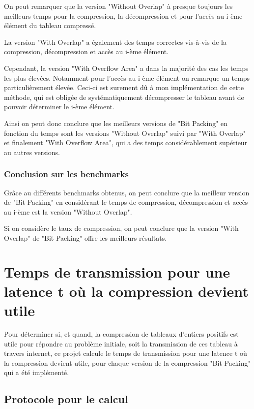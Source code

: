 \documentclass[titlepage]{article}
\begin{document}
On peut remarquer que la version "Without Overlap" à presque toujours les meilleurs temps pour la compression, la décompression et pour l'accès au i-ème élément du tableau compressé.
\par La version "With Overlap" a également des temps correctes vis-à-vis de la compression, décompression et accès au i-ème élément.
\par Cependant, la version "With Overflow Area" a dans la majorité des cas les temps les plus élevées. Notamment pour l'accès au i-ème élément on remarque un temps particulièrement élevée. Ceci-ci est surement dû à mon implémentation de cette méthode, qui est obligée de systématiquement décompresser le tableau avant de pouvoir déterminer le i-ème élément. 
\par Ainsi on peut donc conclure que les meilleurs versions de "Bit Packing" en fonction du temps sont les versions "Without Overlap" suivi par "With Overlap" et finalement "With Overflow Area", qui a des temps considérablement supérieur au autres versions. 

\subsubsection{Conclusion sur les benchmarks}

Grâce au différents benchmarks obtenus, on peut conclure que la meilleur version de "Bit Packing" en considérant le temps de compression, décompression et accès au i-ème est la version "Without Overlap".
\par Si on considère le taux de compression, on peut conclure que la version "With Overlap" de "Bit Packing" offre les meilleurs résultats. 

\clearpage



\section{Temps de transmission pour une latence t où la compression devient utile}

Pour déterminer si, et quand, la compression de tableaux d'entiers positifs est utile pour répondre au problème initiale, soit la transmission de ces tableau à travers internet, ce projet calcule le temps de transmission pour une latence t où la compression devient utile, pour chaque version de la compression "Bit Packing" qui a été implémenté.

\subsection{Protocole pour le calcul}
\end{document}
